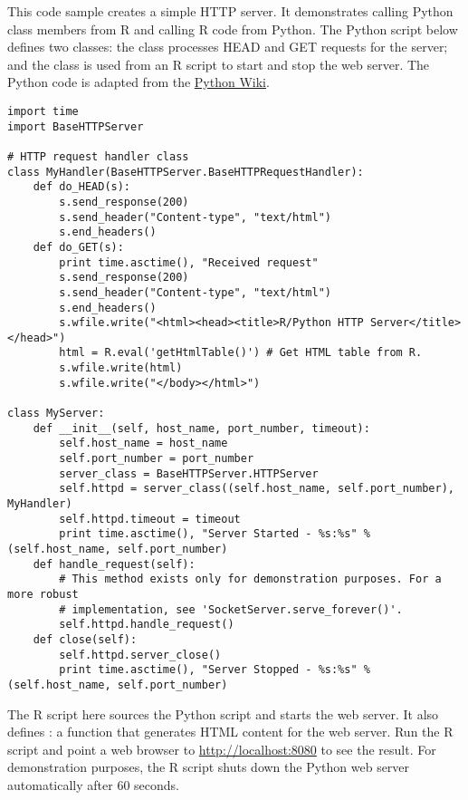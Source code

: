 This code sample creates a simple HTTP server. It demonstrates calling Python class members from R and calling R code from Python. The Python script below defines two classes: the  class processes HEAD and GET requests for the server; and the  class is used from an R script to start and stop the web server. The Python code is adapted from the \href{https://wiki.python.org/moin/BaseHttpServer}{Python Wiki}.

\begin{verbatim}
import time
import BaseHTTPServer

# HTTP request handler class
class MyHandler(BaseHTTPServer.BaseHTTPRequestHandler):
    def do_HEAD(s):
        s.send_response(200)
        s.send_header("Content-type", "text/html")
        s.end_headers()
    def do_GET(s):
        print time.asctime(), "Received request"
        s.send_response(200)
        s.send_header("Content-type", "text/html")
        s.end_headers()
        s.wfile.write("<html><head><title>R/Python HTTP Server</title></head>")
        html = R.eval('getHtmlTable()') # Get HTML table from R.
        s.wfile.write(html)
        s.wfile.write("</body></html>")

class MyServer:
    def __init__(self, host_name, port_number, timeout):
        self.host_name = host_name
        self.port_number = port_number
        server_class = BaseHTTPServer.HTTPServer
        self.httpd = server_class((self.host_name, self.port_number), MyHandler)
        self.httpd.timeout = timeout
        print time.asctime(), "Server Started - %s:%s" % (self.host_name, self.port_number)
    def handle_request(self):
        # This method exists only for demonstration purposes. For a more robust
        # implementation, see 'SocketServer.serve_forever()'.
        self.httpd.handle_request()
    def close(self):
        self.httpd.server_close()
        print time.asctime(), "Server Stopped - %s:%s" % (self.host_name, self.port_number)
\end{verbatim}

The R script here sources the Python script and starts the web server. It also defines : a function that generates HTML content for the web server. Run the R script and point a web browser to \url{http://localhost:8080} to see the result. For demonstration purposes, the R script shuts down the Python web server automatically after 60 seconds.

